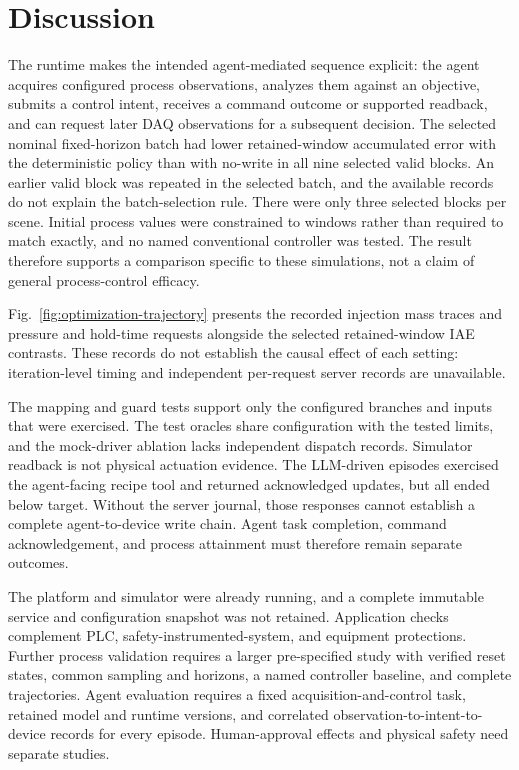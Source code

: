 \documentclass[journal]{IEEEtran}
\begin{document}
 \section{Discussion}
\label{sec:discussion}
The runtime makes the intended agent-mediated sequence explicit: the agent acquires configured process observations, analyzes them against an objective, submits a control intent, receives a command outcome or supported readback, and can request later DAQ observations for a subsequent decision. The selected nominal fixed-horizon batch had lower retained-window accumulated error with the deterministic policy than with no-write in all nine selected valid blocks. An earlier valid block was repeated in the selected batch, and the available records do not explain the batch-selection rule. There were only three selected blocks per scene. Initial process values were constrained to windows rather than required to match exactly, and no named conventional controller was tested. The result therefore supports a comparison specific to these simulations, not a claim of general process-control efficacy.

Fig.~\ref{fig:optimization-trajectory} presents the recorded injection mass traces and pressure and hold-time requests alongside the selected retained-window IAE contrasts. These records do not establish the causal effect of each setting: iteration-level timing and independent per-request server records are unavailable.

The mapping and guard tests support only the configured branches and inputs that were exercised. The test oracles share configuration with the tested limits, and the mock-driver ablation lacks independent dispatch records. Simulator readback is not physical actuation evidence. The LLM-driven episodes exercised the agent-facing recipe tool and returned acknowledged updates, but all ended below target. Without the server journal, those responses cannot establish a complete agent-to-device write chain. Agent task completion, command acknowledgement, and process attainment must therefore remain separate outcomes.

The platform and simulator were already running, and a complete immutable service and configuration snapshot was not retained. Application checks complement PLC, safety-instrumented-system, and equipment protections. Further process validation requires a larger pre-specified study with verified reset states, common sampling and horizons, a named controller baseline, and complete trajectories. Agent evaluation requires a fixed acquisition-and-control task, retained model and runtime versions, and correlated observation-to-intent-to-device records for every episode. Human-approval effects and physical safety need separate studies.
\end{document}
